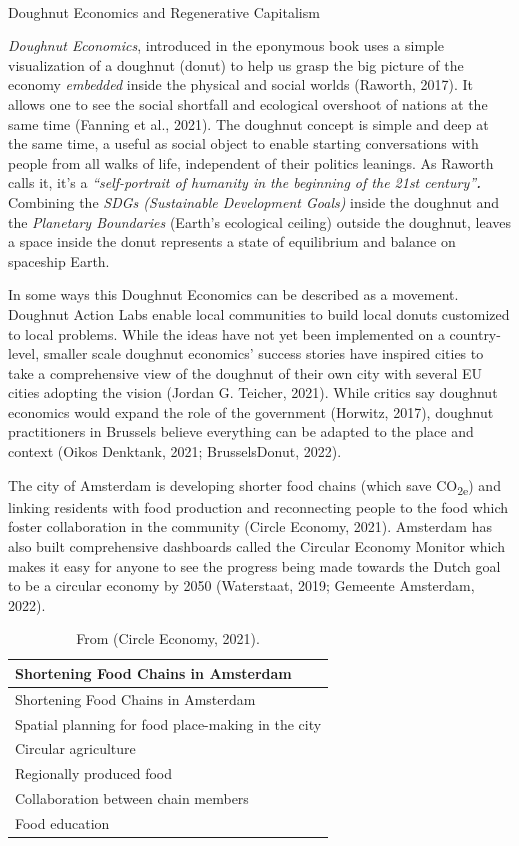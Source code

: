 \documentclass[
  letterpaper,
  DIV=11,
  numbers=noendperiod]{scrartcl}
\makeatletter
\let\oldparagraph\paragraph
\renewcommand{\paragraph}{
    \@ifstar
      \xxxParagraphStar
      \xxxParagraphNoStar
  }
\newcommand{\xxxParagraphStar}[1]{\oldparagraph*{#1}\mbox{}}
\newcommand{\xxxParagraphNoStar}[1]{\oldparagraph{#1}\mbox{}}
\makeatother
\begin{document}
\paragraph{Doughnut Economics and Regenerative
Capitalism}\label{doughnut-economics-and-regenerative-capitalism}

\emph{Doughnut Economics}, introduced in the eponymous book uses a
simple visualization of a doughnut (donut) to help us grasp the big
picture of the economy \emph{embedded} inside the physical and social
worlds (Raworth, 2017). It allows one to see the social shortfall and
ecological overshoot of nations at the same time (Fanning et al., 2021).
The doughnut concept is simple and deep at the same time, a useful as
social object to enable starting conversations with people from all
walks of life, independent of their politics leanings. As Raworth calls
it, it's a \emph{``self-portrait of humanity in the beginning of the
21st century''\textbf{.}} Combining the \emph{SDGs (Sustainable
Development Goals)} inside the doughnut and the \emph{Planetary
Boundaries} (Earth's ecological ceiling) outside the doughnut, leaves a
space inside the donut represents a state of equilibrium and balance on
spaceship Earth.

In some ways this Doughnut Economics can be described as a movement.
Doughnut Action Labs enable local communities to build local donuts
customized to local problems. While the ideas have not yet been
implemented on a country-level, smaller scale doughnut economics'
success stories have inspired cities to take a comprehensive view of the
doughnut of their own city with several EU cities adopting the vision
(Jordan G. Teicher, 2021). While critics say doughnut economics would
expand the role of the government (Horwitz, 2017), doughnut
practitioners in Brussels believe everything can be adapted to the place
and context (Oikos Denktank, 2021; BrusselsDonut, 2022).

The city of Amsterdam is developing shorter food chains (which save
CO\textsubscript{2e}) and linking residents with food production and
reconnecting people to the food which foster collaboration in the
community (Circle Economy, 2021). Amsterdam has also built comprehensive
dashboards called the Circular Economy Monitor which makes it easy for
anyone to see the progress being made towards the Dutch goal to be a
circular economy by 2050 (Waterstaat, 2019; Gemeente Amsterdam, 2022).

\begin{longtable}[]{@{}l@{}}
\caption{From (Circle Economy, 2021).}\tabularnewline
\toprule\noalign{}
Shortening Food Chains in Amsterdam \\
\midrule\noalign{}
\endfirsthead
\toprule\noalign{}
Shortening Food Chains in Amsterdam \\
\midrule\noalign{}
\endhead
\bottomrule\noalign{}
\endlastfoot
Spatial planning for food place-making in the city \\
Circular agriculture \\
Regionally produced food \\
Collaboration between chain members \\
Food education \\
\end{longtable}
\end{document}
